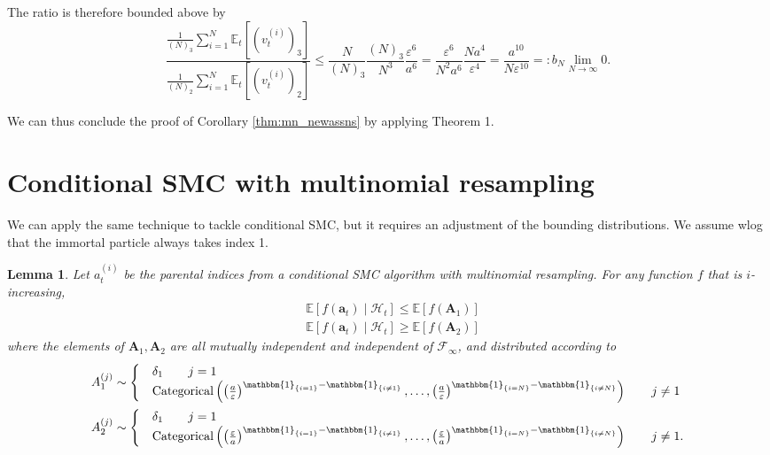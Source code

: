 \documentclass[fleqn]{article}
\newtheorem{lemma}{Lemma}
\theoremstyle{definition}
\newcommand{\E}{\mathbb{E}}
\newcommand{\1}[1]{\mathbbm{1}_{\{#1\}}}
\newcommand{\limNtoinfty}{\underset{N\to\infty}{\lim}}
\newcommand{\Cat}{\operatorname{Categorical}}
\newcommand{\vt}[2][t]{v_{#1}^{(#2)}}
\begin{document}
The ratio is therefore bounded above by
\begin{equation*}
\frac{\frac{1}{(N)_3} \sum_{i=1}^N \E_t[(\vt{i})_3]}{\frac{1}{(N)_2} \sum_{i=1}^N \E_t[(\vt{i})_2]}
\leq \frac{N}{(N)_3} \frac{(N)_3}{N^3}\frac{\varepsilon^6}{a^6}
= \frac{\varepsilon^6}{N^2a^6} \frac{Na^4}{\varepsilon^4} = \frac{a^{10}}{N\varepsilon^{10}} =: b_N \limNtoinfty 0.
\end{equation*}

We can thus conclude the proof of Corollary \ref{thm:mn_newassns} by applying Theorem 1.


\section*{Conditional SMC with multinomial resampling}
We can apply the same technique to tackle conditional SMC, but it requires an adjustment of the bounding distributions.
We assume wlog that the immortal particle always takes index 1.

\begin{lemma}\label{lem:i_increasing_csmc}
Let $a_t^{(i)}$ be the parental indices from a  conditional SMC algorithm with multinomial resampling. For any function $f$ that is $i$-increasing, 
\begin{align*}
& \E[f(\mathbf{a}_t) \mid \mathcal{H}_t] \leq \E[f(\mathbf{A}_1)] \\
& \E[f(\mathbf{a}_t) \mid \mathcal{H}_t] \geq \E[f(\mathbf{A}_2)]
\end{align*}
where the elements of $\mathbf{A}_1, \mathbf{A}_2$ are all mutually independent and independent of $\mathcal{F}_{\infty}$, and distributed according to
\begin{align*}
& A_1^{(j)} \sim \begin{cases}
& \delta_1  \qquad j=1\\
& \Cat\left( \left( \frac{a}{\varepsilon} \right)^{\1{i=1} -\1{i\neq 1}} ,\dots, \left( \frac{a}{\varepsilon} \right)^{\1{i=N} -\1{i\neq N}} \right) \qquad j\neq 1
 \end{cases}\\
& A_2^{(j)} \sim \begin{cases}
& \delta_1 \qquad j=1 \\
& \Cat\left( \left( \frac{\varepsilon}{a} \right)^{\1{i=1} -\1{i\neq 1}} ,\dots, \left( \frac{\varepsilon}{a} \right)^{\1{i=N} -\1{i\neq N}} \right) \qquad j\neq 1 .
\end{cases}
\end{align*}
\end{lemma}
\end{document}
